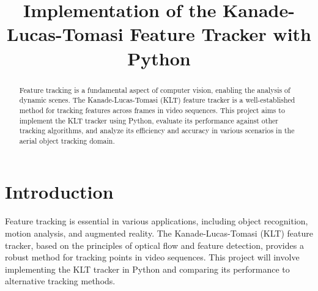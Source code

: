 \documentclass[journal]{IEEEtran}
\begin{document}
\title{Implementation of the Kanade-Lucas-Tomasi Feature Tracker with Python}

\author{
\vspace{-10pt}
}

\maketitle

\begin{abstract}
Feature tracking is a fundamental aspect of computer vision, enabling the analysis of dynamic scenes. The Kanade-Lucas-Tomasi (KLT) feature tracker is a well-established method for tracking features across frames in video sequences. This project aims to implement the KLT tracker using Python, evaluate its performance against other tracking algorithms, and analyze its efficiency and accuracy in various scenarios in the aerial object tracking domain.
\end{abstract}


\section{Introduction}
Feature tracking is essential in various applications, including object recognition, motion analysis, and augmented reality. The Kanade-Lucas-Tomasi (KLT) feature tracker, based on the principles of optical flow and feature detection, provides a robust method for tracking points in video sequences. This project will involve implementing the KLT tracker in Python and comparing its performance to alternative tracking methods.
\end{document}
